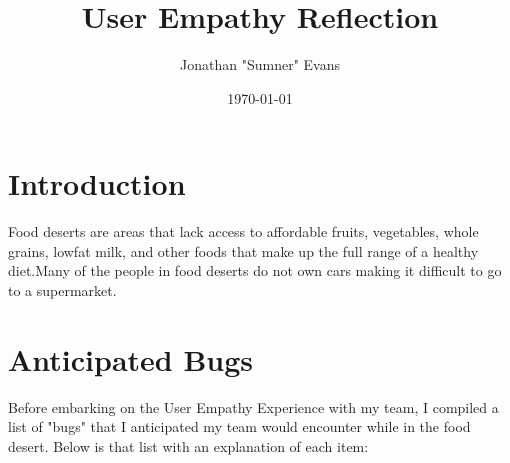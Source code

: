 \documentclass[11pt]{article}
\title{User Empathy Reflection}
\author{Jonathan "Sumner" Evans}
\date{\today}
\begin{document}
\maketitle

\section{Introduction} %
Food deserts are areas that lack access to affordable fruits, vegetables, whole grains, lowfat milk,
and other foods that make up the full range of a healthy diet.\footnotemark[1] Many of the people in
food deserts do not own cars making it difficult to go to a supermarket. %


\section{Anticipated Bugs}
Before embarking on the User Empathy Experience with my team, I compiled a list of "bugs" that I
anticipated my team would encounter while in the food desert. Below is that list with an explanation
of each item:
\end{document}
